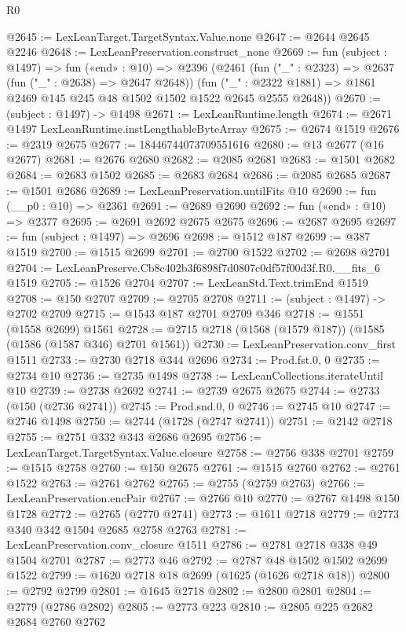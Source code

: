 \begin{lexlean}{R0}
\begin{coremodule}
@2645 := LexLeanTarget.TargetSyntax.Value.none
@2647 := @2644 @2645 @2246
@2648 := LexLeanPreservation.construct_none
@2669 := fun (subject : @1497) =>
  fun («end» : @10) =>
  @2396
    (@2461
      (fun ("_" : @2323) => @2637 (fun ("_" : @2638) => @2647 @2648))
      (fun ("_" : @2322 @1881) => @1861 @2469 @145 @245 @48 @1502 @1502 @1522 @2645 @2555 @2648))
@2670 := (subject : @1497) -> @1498
@2671 := LexLeanRuntime.length
@2674 := @2671 @1497 LexLeanRuntime.instLengthableByteArray
@2675 := @2674 @1519
@2676 := @2319 @2675
@2677 := 18446744073709551616
@2680 := @13 @2677 (@16 @2677)
@2681 := @2676 @2680
@2682 := @2085 @2681
@2683 := @1501 @2682
@2684 := @2683 @1502
@2685 := @2683 @2684
@2686 := @2085 @2685
@2687 := @1501 @2686
@2689 := LexLeanPreservation.untilFits @10
@2690 := fun (__p0 : @10) => @2361
@2691 := @2689 @2690
@2692 := fun («end» : @10) => @2377
@2695 := @2691 @2692 @2675 @2675
@2696 := @2687 @2695
@2697 := fun (subject : @1497) => @2696
@2698 := @1512 @187
@2699 := @387 @1519
@2700 := @1515 @2699
@2701 := @2700 @1522
@2702 := @2698 @2701
@2704 := LexLeanPreserve.Cb8c402b3f6898f7d0807c0df57f00d3f.R0.__fits_6 @1519
@2705 := @1526 @2704
@2707 := LexLeanStd.Text.trimEnd @1519
@2708 := @150 @2707
@2709 := @2705 @2708
@2711 := (subject : @1497) -> @2702 @2709
@2715 := @1543 @187 @2701 @2709 @346
@2718 := @1551 (@1558 @2699) @1561
@2728 := @2715 @2718 (@1568 (@1579 @187)) (@1585 (@1586 (@1587 @346) @2701 @1561))
@2730 := LexLeanPreservation.conv_first @1511
@2733 := @2730 @2718 @344 @2696
@2734 := Prod.fst.{0, 0}
@2735 := @2734 @10
@2736 := @2735 @1498
@2738 := LexLeanCollections.iterateUntil @10
@2739 := @2738 @2692
@2741 := @2739 @2675 @2675
@2744 := @2733 (@150 (@2736 @2741))
@2745 := Prod.snd.{0, 0}
@2746 := @2745 @10
@2747 := @2746 @1498
@2750 := @2744 (@1728 (@2747 @2741))
@2751 := @2142 @2718
@2755 := @2751 @332 @343 @2686 @2695
@2756 := LexLeanTarget.TargetSyntax.Value.closure
@2758 := @2756 @338 @2701
@2759 := @1515 @2758
@2760 := @150 @2675
@2761 := @1515 @2760
@2762 := @2761 @1522
@2763 := @2761 @2762
@2765 := @2755 (@2759 @2763)
@2766 := LexLeanPreservation.encPair
@2767 := @2766 @10
@2770 := @2767 @1498 @150 @1728
@2772 := @2765 (@2770 @2741)
@2773 := @1611 @2718
@2779 := @2773 @340 @342 @1504 @2685 @2758 @2763
@2781 := LexLeanPreservation.conv_closure @1511
@2786 := @2781 @2718 @338 @49 @1504 @2701
@2787 := @2773 @46
@2792 := @2787 @48 @1502 @1502 @2699 @1522
@2799 := @1620 @2718 @18 @2699 (@1625 (@1626 @2718 @18))
@2800 := @2792 @2799
@2801 := @1645 @2718
@2802 := @2800 @2801
@2804 := @2779 (@2786 @2802)
@2805 := @2773 @223
@2810 := @2805 @225 @2682 @2684 @2760 @2762

\end{coremodule}
\end{lexlean}
